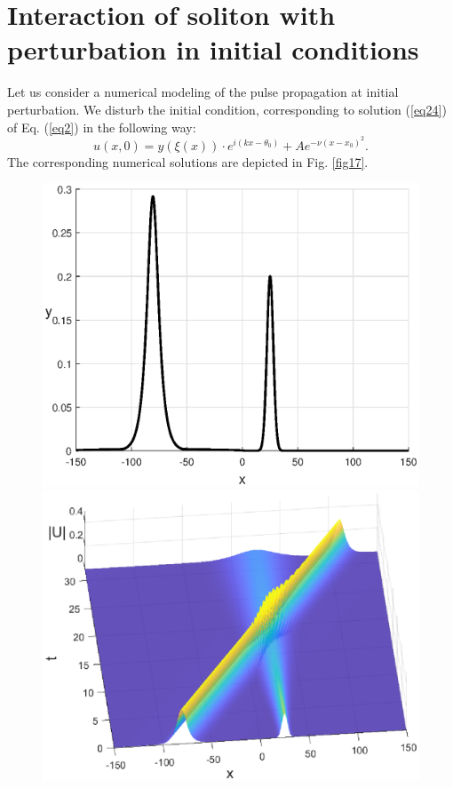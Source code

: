 \documentclass[preprint,12pt]{elsarticle}
\begin{document}
\section{Interaction of soliton with perturbation in initial conditions}\label{ch8}
Let us consider a numerical modeling of the pulse propagation at initial perturbation. We disturb the initial condition, corresponding to solution (\ref{eq24}) of Eq. (\ref{eq2}) in the following way:
\begin{equation} \label{eq52}
u(x,0)=y\left(\xi\left(x\right)\right)\cdot e^{i(kx-\theta_{0})}+Ae^{-\nu(x-x_{0})^{2}}.
\end{equation}
The corresponding numerical solutions are depicted in Fig. \ref{fig17}.
\begin{figure}[H] %
\begin{center}
\begin{minipage}[h]{0.48\linewidth}
\includegraphics[width=1\linewidth]{fig18.eps}
\end{minipage}
\hfill
\begin{minipage}[h]{0.48\linewidth}
\includegraphics[width=1\linewidth]{fig19.eps}

\end{minipage}
\end{center}
\end{figure}
\end{document}
